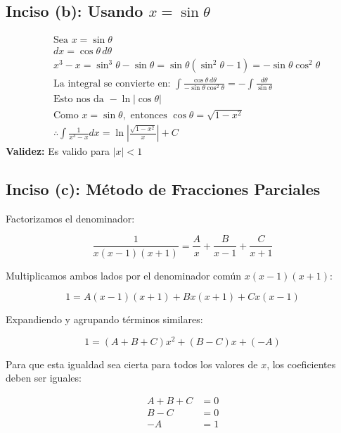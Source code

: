 \documentclass[11pt,letterpaper]{article}
\begin{document}
\subsection*{Inciso (b): Usando $x = \sin \theta$}

\begin{align*}
& \text{Sea } x = \sin \theta \\
& dx = \cos \theta \, d\theta \\
& x^3 - x = \sin^3\theta - \sin \theta = \sin \theta(\sin^2\theta - 1) = -\sin \theta \cos^2\theta \\
& \text{La integral se convierte en: } \int\frac{\cos \theta \, d\theta}{-\sin \theta \cos^2\theta} = -\int\frac{d\theta}{\sin \theta} \\
& \text{Esto nos da } -\ln|\cos \theta| \\
& \text{Como } x = \sin \theta, \text{ entonces } \cos \theta = \sqrt{1-x^2} \\
& \therefore \int\frac{1}{x^3-x}dx = \ln\left|\frac{\sqrt{1-x^2}}{x}\right| + C 
\end{align*}
\textbf{ Validez:} Es valido para $|x| < 1$

\subsection*{Inciso (c): M\'etodo de Fracciones Parciales}
Factorizamos el denominador:

\begin{equation*}
    \frac{1}{x(x-1)(x+1)} = \frac{A}{x} + \frac{B}{x-1} + \frac{C}{x+1}
\end{equation*}

Multiplicamos ambos lados por el denominador com\'un $x(x-1)(x+1)$:

\begin{equation*}
    1 = A(x-1)(x+1) + Bx(x+1) + Cx(x-1)
\end{equation*}

Expandiendo y agrupando t\'erminos similares:

\begin{equation*}
    1 = (A + B + C)x^2 + (B - C)x + (-A)
\end{equation*}

Para que esta igualdad sea cierta para todos los valores de $x$, los coeficientes deben ser iguales:

\begin{align*}
    A + B + C &= 0 \\
    B - C &= 0 \\
    -A &= 1
\end{align*}
\end{document}
